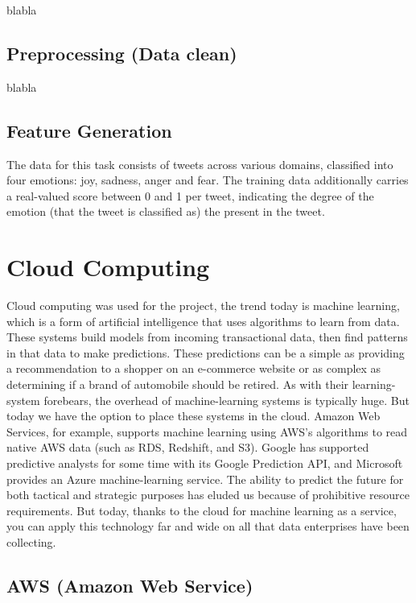 \documentclass{acmtog} %
\begin{document}
blabla

\subsection{Preprocessing (Data clean)}
\label{subsub:preprocessing}

blabla

\subsection{Feature Generation}
\label{subsub:feature}

The data for this task consists of tweets across various domains, classified into four emotions: joy, sadness, anger and fear. The training data additionally carries a real-valued score between 0 and 1 per tweet, indicating the degree of the emotion (that the tweet is classified as) the present in the tweet.

\section{Cloud Computing}
\label{sec:cloud_computing}

Cloud computing was used for the project, the trend today is machine learning, which is a form of artificial intelligence that uses algorithms to learn from data. These systems build models from incoming transactional data, then find patterns in that data to make predictions. These predictions can be a simple as providing a recommendation to a shopper on an e-commerce website or as complex as determining if a brand of automobile should be retired. As with their learning-system forebears, the overhead of machine-learning systems is typically huge. But today we have the option to place these systems in the cloud. Amazon Web Services, for example, supports machine learning using AWS's algorithms to read native AWS data (such as RDS, Redshift, and S3). Google has supported predictive analysts for some time with its Google Prediction API, and Microsoft provides an Azure machine-learning service. The ability to predict the future for both tactical and strategic purposes has eluded us because of prohibitive resource requirements. But today, thanks to the cloud for machine learning as a service, you can apply this technology far and wide on all that data enterprises have been collecting.

\subsection{AWS (Amazon Web Service)}
\label{subsub:aws}
\end{document}
